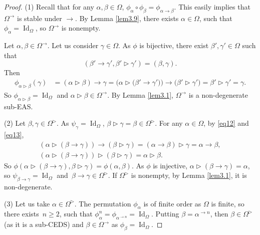 \documentclass[pdftex]{sigma}
\numberwithin{equation}{section}
\begin{document}
\begin{proof}
(1) Recall that for any $\alpha,\beta \in \Omega$, $\phi_\alpha\circ \phi_\beta=\phi_{\alpha \rightarrow \beta}$. This easily implies that $\Omega^\rightarrow$ is stable under $\rightarrow$.
By Lemma \ref{lem3.9}, there exists $\alpha \in \Omega$, such that $\phi_\alpha=\operatorname{Id}_\Omega$, so $\Omega^\rightarrow$ is nonempty.

Let $\alpha,\beta \in \Omega^\rightarrow$. Let us consider $\gamma \in \Omega$. As $\phi$ is bijective, there exist $\beta',\gamma'\in \Omega$ such that
\[(\beta'\rightarrow \gamma',\beta'\triangleright \gamma')=(\beta,\gamma).\]
Then
\begin{align*}
\phi_{\alpha \triangleright \beta}(\gamma)&=(\alpha\triangleright \beta)\rightarrow \gamma=\bigl(\alpha \triangleright\bigl(\beta'\rightarrow \gamma'\bigr)\bigr)\rightarrow \bigl(\beta' \triangleright \gamma'\bigr)=\beta' \triangleright \gamma'=\gamma.
\end{align*}
So $\phi_{\alpha \triangleright \beta}=\operatorname{Id}_\Omega$ and $\alpha \triangleright \beta \in \Omega^\rightarrow$. By Lemma \ref{lem3.1}, $\Omega^\rightarrow$ is a non-degenerate sub-EAS.

(2) Let $\beta,\gamma \in \Omega^\triangleright$. As $\psi_\gamma=\operatorname{Id}_\Omega$, $\beta\triangleright \gamma=\beta \in \Omega^\triangleright$. For any $\alpha \in \Omega$, by \eqref{eq12} and \eqref{eq13},
\begin{gather*}
(\alpha \triangleright (\beta\rightarrow \gamma))\rightarrow (\beta \triangleright \gamma) =(\alpha \rightarrow \beta)\triangleright \gamma=\alpha \rightarrow \beta,\\
(\alpha \triangleright (\beta\rightarrow \gamma))\triangleright (\beta \triangleright \gamma) =\alpha \triangleright \beta.
\end{gather*}
So $\phi(\alpha \triangleright (\beta\rightarrow \gamma),\beta \triangleright \gamma)=\phi(\alpha,\beta)$.
As $\phi$ is injective, $\alpha \triangleright (\beta\rightarrow \gamma)=\alpha$, so $\psi_{\beta \rightarrow \gamma}=\operatorname{Id}_\Omega$ and~${\beta \rightarrow \gamma\in \Omega^\triangleright}$.
If $\Omega^\triangleright$ is nonempty, by Lemma \ref{lem3.1}, it is non-degenerate.

(3) Let us take $\alpha \in \Omega^\triangleright$. The permutation $\phi_\alpha$ is of finite order as $\Omega$ is finite, so there exists~${n\geqslant 2}$, such that $\phi_{\alpha}^n=\phi_{\alpha^{\rightarrow n}}=\operatorname{Id}_\Omega$.
Putting $\beta=\alpha^{\rightarrow n}$, then $\beta \in \Omega^{\triangleright}$ (as it is a sub-CEDS) and $\beta \in \Omega^\rightarrow$ as $\phi_\beta=\operatorname{Id}_\Omega$.


\end{proof}
\end{document}
